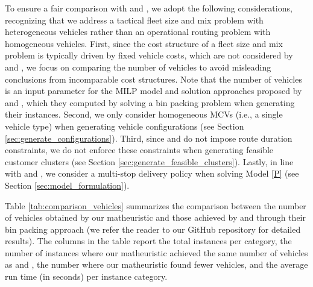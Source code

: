 \documentclass[11pt]{elsarticle}
\theoremstyle{plain}
\newcommand{\blue}[1]{#1}
\begin{document}
\blue{To ensure a fair comparison with \cite{henke2015multi} and \cite{henke2019branch}}, we adopt the following considerations, recognizing that we address a tactical fleet size and mix problem with heterogeneous vehicles rather than an operational routing problem with homogeneous vehicles. 
First, since the cost structure of a fleet size and mix problem is typically driven by fixed vehicle costs, which are not considered by \cite{henke2015multi} and \cite{henke2019branch}, we focus on comparing the number of vehicles to avoid misleading conclusions from incomparable cost structures. Note that the number of vehicles is an input parameter for the \ac{MILP} model and solution approaches proposed by \cite{henke2015multi} and \cite{henke2019branch}, which they computed by solving a bin packing problem when generating their instances.
Second, we only consider homogeneous \acp{MCV} (i.e., a single vehicle type) when generating vehicle configurations (see Section \ref{sec:generate_configurations}).
Third, since \cite{henke2015multi} and \cite{henke2019branch} do not impose route duration constraints, we do not enforce these constraints when generating feasible customer clusters (see Section \ref{sec:generate_feasible_clusters}).
Lastly, in line with \cite{henke2015multi} and \cite{henke2019branch}, we consider a multi-stop delivery policy when solving \blue{Model} \eqref{P} (see Section \ref{sec:model_formulation}).

Table \ref{tab:comparison_vehicles} summarizes the comparison between the number of vehicles obtained by our matheuristic and those achieved by \cite{henke2015multi} and \cite{henke2019branch} through their bin packing approach (we refer the reader to our GitHub repository for detailed results). The columns in the table report the total instances per category, the number of instances where our matheuristic achieved the same number of vehicles as \cite{henke2015multi} and \cite{henke2019branch}, the number where our matheuristic found fewer vehicles, and the average run time (in seconds) per instance category. 
\end{document}
